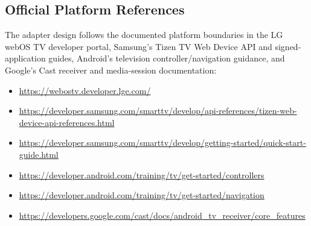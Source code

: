 \subsection{Official Platform References}

The adapter design follows the documented platform boundaries in the LG webOS TV
developer portal, Samsung's Tizen TV Web Device API and signed-application guides,
Android's television controller/navigation guidance, and Google's Cast receiver
and media-session documentation:

\begin{itemize}
  \item \url{https://webostv.developer.lge.com/}
  \item \url{https://developer.samsung.com/smarttv/develop/api-references/tizen-web-device-api-references.html}
  \item \url{https://developer.samsung.com/smarttv/develop/getting-started/quick-start-guide.html}
  \item \url{https://developer.android.com/training/tv/get-started/controllers}
  \item \url{https://developer.android.com/training/tv/get-started/navigation}
  \item \url{https://developers.google.com/cast/docs/android_tv_receiver/core_features}
\end{itemize}

